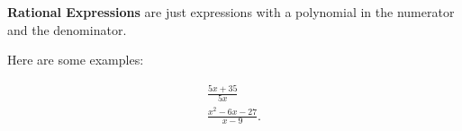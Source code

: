 
\begin{definition}
  \textbf{Rational Expressions} are just expressions with a polynomial in the
  numerator and the denominator.

  Here are some examples:

  \begin{align}
    \frac{5x + 35}{5x} \\
    \frac{x^2 - 6x - 27}{x - 9}
  .\end{align}
\end{definition}


\newpage
